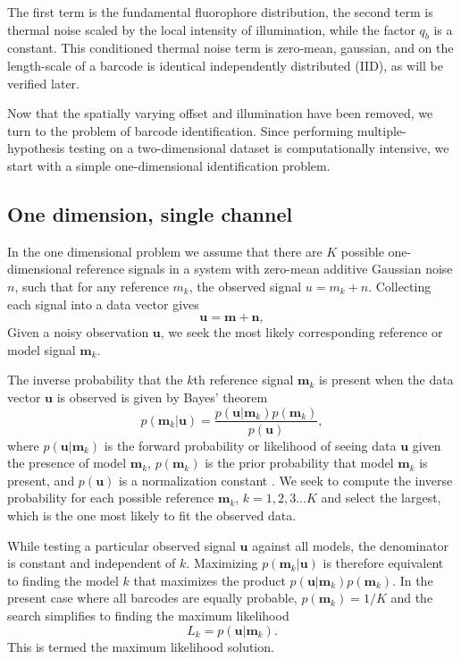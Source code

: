 The first term is the fundamental fluorophore distribution, the second term is thermal noise scaled by the local intensity of illumination, while the factor $q_b$ is a constant. This conditioned thermal noise term is zero-mean, gaussian, and on the length-scale of a barcode is identical independently distributed (IID), as will be verified later.

Now that the spatially varying offset and illumination have been removed, we turn to the problem of barcode identification. Since performing multiple-hypothesis testing on a two-dimensional dataset is computationally intensive, we start with a simple one-dimensional identification problem. 

\subsection{One dimension, single channel}
In the one dimensional problem we assume that there are $K$ possible one-dimensional reference signals in a system with zero-mean additive Gaussian noise $n$, such that for any reference $m_k$, the observed signal $u=m_k+n$. Collecting each signal into a data vector gives
\begin{equation}
\mathbf{u}=\mathbf{m} + \mathbf{n},
\end{equation}
Given a noisy observation $\mathbf{u}$, we seek the most likely corresponding reference or model signal $\mathbf{m}_k$. 

The inverse probability that the $k$th reference signal $\mathbf{m}_k$ is present when the data vector $\mathbf{u}$ is observed is given by Bayes' theorem
\begin{equation}\label{eq:Bayes}
p(\mathbf{m}_k|\mathbf{u}) = \frac{p(\mathbf{u}|\mathbf{m}_k)p(\mathbf{m}_k)} {p(\mathbf{u})},
\end{equation}
where $p(\mathbf{u}|\mathbf{m}_k)$ is the forward probability or likelihood of seeing data $\mathbf{u}$ given the presence of model $\mathbf{m}_k$, $p(\mathbf{m}_k)$ is the prior probability that model $\mathbf{m}_k$ is present, and $p(\mathbf{u})$ is a normalization constant \citep{bretthorst_probability_2003}. We seek to compute the inverse probability for each possible reference $\mathbf{m}_k$, $k=1,2,3 \ldots K$ and select the largest, which is the one most likely to fit the observed data.

While testing a particular observed signal $\mathbf{u}$ against all models, the denominator is constant and independent of $k$. Maximizing $p(\mathbf{m}_k|\mathbf{u})$ is therefore equivalent to finding the model $k$ that maximizes the product  $p(\mathbf{u}|\mathbf{m}_k)p(\mathbf{m}_k)$.
In the present case where all barcodes are equally probable,
$p(\mathbf{m}_k)=1/K$ 
and the search simplifies to finding the maximum likelihood 
\begin{equation}
L_k = p(\mathbf{u}|\mathbf{m}_k).
\end{equation}
This is termed the maximum likelihood solution.


